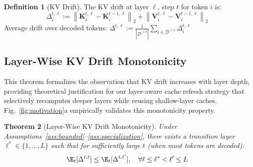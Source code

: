 \documentclass{article} %
\newtheorem{theorem}{Theorem}[section]
\theoremstyle{definition}
\newtheorem{definition}[theorem]{Definition}
\theoremstyle{remark}
\newcommand{\norm}[1]{\left\|#1\right\|}
\begin{document}
\begin{definition}[KV Drift]
The KV drift at layer $\ell$, step $t$ for token $i$ is:
\begin{equation}
\Delta^{t,\ell}_i := \norm{\mathbf{K}^{t,\ell}_i - \mathbf{K}^{t-1,\ell}_i}_2 + \norm{\mathbf{V}^{t,\ell}_i - \mathbf{V}^{t-1,\ell}_i}_2
\end{equation}
Average drift over decoded tokens: $\Delta^{t,\ell} := \frac{1}{|\mathcal{D}^{<t}|} \sum_{i \in \mathcal{D}^{<t}} \Delta^{t,\ell}_i$
\end{definition}

\subsection{Layer-Wise KV Drift Monotonicity}

This theorem formalizes the observation that KV drift increases with layer depth, providing theoretical justification for our layer-aware cache refresh strategy that selectively recomputes deeper layers while reusing shallow-layer caches. Fig.~\ref{fig:motivation}a empirically validates this monotonicity property.

\begin{theorem}[Layer-Wise KV Drift Monotonicity]\label{thm:drift-monotonicity}
Under Assumptions~\ref{ass:bounded}--\ref{ass:specialization}, there exists a transition layer $\ell^* \in \{1,\ldots,L\}$ such that for sufficiently large $t$ (when most tokens are decoded):
\begin{equation}
\E_t[\Delta^{t,\ell}] \leq \E_t[\Delta^{t,\ell'}], \quad \forall \ell \leq \ell^* < \ell' \leq L
\end{equation}
\end{theorem}
\end{document}
